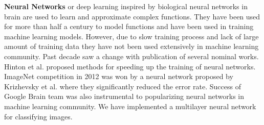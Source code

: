 \documentclass{sig-alternate-05-2015}
\begin{document}
\textbf{Neural Networks} or deep learning inspired by biological neural networks in brain are used to learn and approximate complex functions. 
They have been used for more than half a century to model functions and have been used in training machine learning models.
However, due to slow training process and lack of large amount of training data they have not been used extensively in machine learning community.
Past decade saw a change with publication of several nominal works.
Hinton et al. \cite{hinton2006fast} proposed methods for speeding up the training of neural networks.
ImageNet competition \cite{ILSVRC15} in 2012 was won by a neural network proposed by Krizhevsky et al. \cite{krizhevsky2012imagenet} where they significantly reduced the error rate. 
Success of Google Brain team \cite{sutskever2014sequence, mikolov2013efficient} was also instrumental to popularizing neural networks in machine learning community.
We have implemented a multilayer neural network for classifying images.
\end{document}
